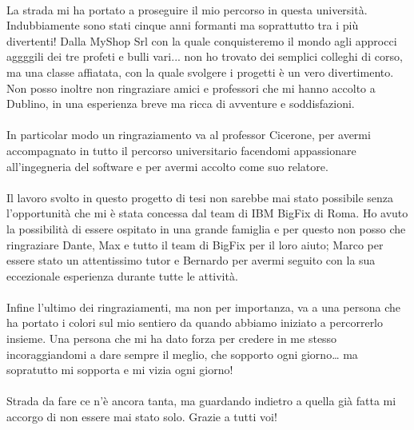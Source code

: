 \paragraph{}
La strada mi ha portato a proseguire il mio percorso in questa università. Indubbiamente sono stati cinque anni formanti ma soprattutto tra i più divertenti! Dalla MyShop Srl con la quale conquisteremo il mondo agli approcci aggggili dei tre profeti e bulli vari... non ho trovato dei semplici colleghi di corso, ma una classe affiatata, con la quale svolgere i progetti è un vero divertimento. Non posso inoltre non ringraziare amici e professori che mi hanno accolto a Dublino, in una esperienza breve ma ricca di avventure e soddisfazioni.

\paragraph{}
In particolar modo un ringraziamento va al professor Cicerone, per avermi accompagnato in tutto il percorso universitario facendomi appassionare all'ingegneria del software e per avermi accolto come suo relatore.

\paragraph{}
Il lavoro svolto in questo progetto di tesi non sarebbe mai stato possibile senza l'opportunità che mi è stata concessa dal team di IBM BigFix di Roma. Ho avuto la possibilità di essere ospitato in una grande famiglia e per questo non posso che ringraziare Dante, Max e tutto il team di BigFix per il loro aiuto; Marco per essere stato un attentissimo tutor e Bernardo per avermi seguito con la sua eccezionale esperienza durante tutte le attività.

\paragraph{}
Infine l’ultimo dei ringraziamenti, ma non per importanza, va a una persona che ha portato i colori sul mio sentiero da quando abbiamo iniziato a percorrerlo insieme. Una persona che mi ha dato forza per credere in me stesso incoraggiandomi a dare sempre il meglio, che sopporto ogni giorno… ma sopratutto mi sopporta e mi vizia ogni giorno!

\paragraph{}
Strada da fare ce n'è ancora tanta, ma guardando indietro a quella già fatta mi accorgo di non essere mai stato solo. Grazie a tutti voi!